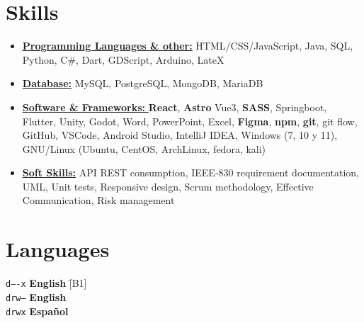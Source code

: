 \documentclass[11pt,a4paper,sans]{moderncv}
\newcommand{\sectionMargin}{-3mm}
\begin{document}
\section{Skills}{
\begin{itemize}[label=\textbullet, noitemsep]
\item {\underline{\textbf{Programming Languages \& other:}} 
    {HTML/CSS/JavaScript},
    {Java},
    {SQL},
    {Python},
    {C\#},
    {Dart},
    {GDScript},
    {Arduino},
    {LateX}
}
\item {\underline{\textbf{Database:}}
    {MySQL},
    {PostgreSQL},
    {MongoDB},
    {MariaDB}
}
\item {\underline{\textbf{Software \& Frameworks: }}
    \textbf{React},
    \textbf{Astro}
    {Vue3},
    \textbf{SASS},
    {Springboot},
    {Flutter},
    {Unity},
    {Godot},
    {Word},
    {PowerPoint},
    {Excel}, 
    \textbf{Figma},
    \textbf{npm},
    \textbf{git},
    {git flow},
    {GitHub},
    {VSCode},
    {Android Studio},
    {IntelliJ IDEA},
    {Windows} (7, 10 y 11),
    {GNU/Linux} (Ubuntu, CentOS, ArchLinux, fedora, kali)
}
\item {\underline{\textbf{Soft Skills:}}
    {API REST} consumption,
    {IEEE-830} requirement documentation,
    {UML},
    {Unit tests},
    {Responsive design},
    {Scrum} methodology,
    Effective Communication, 
    {Risk management}
}
\end{itemize}}

\vspace*{\sectionMargin}

\section{Languages}
\begin{tabbing}
    \texttt{d----x} \hspace{1mm}\= \textbf{English} \hspace{1mm}\= [B1] \\
    \texttt{drw--} \> \textbf{English} \> [Technical] \\
    \texttt{drwx} \> \textbf{Español} \> [Native] \\
\end{tabbing}
\end{document}
